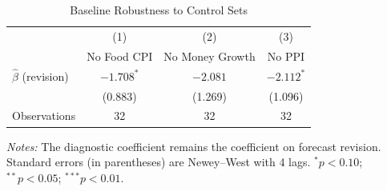 \begin{table}[htbp]
\centering
\begin{threeparttable}
\caption{Baseline Robustness to Control Sets}
\label{tab:ols_robustness}
{\small
\begin{tabular}{lccc}
\toprule
 & (1) & (2) & (3) \\
 & No Food CPI & No Money Growth & No PPI \\
\midrule
$\hat{\beta}$ (revision) & $-1.708^{*}$ & $-2.081$ & $-2.112^{*}$ \\
 & (0.883) & (1.269) & (1.096) \\
\addlinespace
Observations & 32 & 32 & 32 \\
\bottomrule
\end{tabular}
}
\begin{tablenotes}[flushleft]
\footnotesize
\item \textit{Notes:} The diagnostic coefficient remains the coefficient on forecast revision. Standard errors (in parentheses) are Newey--West with 4 lags. $^{*}p<0.10$; $^{**}p<0.05$; $^{***}p<0.01$.
\end{tablenotes}
\end{threeparttable}
\end{table}
